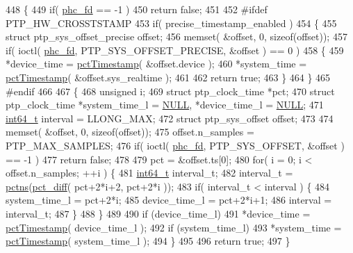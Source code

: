 \begin{DoxyCode}
448 \{
449     \textcolor{keywordflow}{if}( \hyperlink{class_linux_timestamper_generic_ac4500de48048f43e4cfd225a42c8bd56}{phc\_fd} == -1 )
450         \textcolor{keywordflow}{return} \textcolor{keyword}{false};
451 
452 \textcolor{preprocessor}{#ifdef PTP\_HW\_CROSSTSTAMP}
453     \textcolor{keywordflow}{if}( precise\_timestamp\_enabled )
454     \{
455         \textcolor{keyword}{struct }ptp\_sys\_offset\_precise offset;
456         memset( &offset, 0, \textcolor{keyword}{sizeof}(offset));
457         \textcolor{keywordflow}{if}( ioctl( \hyperlink{class_linux_timestamper_generic_ac4500de48048f43e4cfd225a42c8bd56}{phc\_fd}, PTP\_SYS\_OFFSET\_PRECISE, &offset ) == 0 )
458         \{
459             *device\_time = \hyperlink{linux__hal__generic_8cpp_a3943f78a47990dfd984f029f52c4eb9a}{pctTimestamp}( &offset.device );
460             *system\_time = \hyperlink{linux__hal__generic_8cpp_a3943f78a47990dfd984f029f52c4eb9a}{pctTimestamp}( &offset.sys\_realtime );
461 
462             \textcolor{keywordflow}{return} \textcolor{keyword}{true};
463         \}
464     \}
465 \textcolor{preprocessor}{#endif}
466 
467     \{
468         \textcolor{keywordtype}{unsigned} i;
469         \textcolor{keyword}{struct }ptp\_clock\_time *pct;
470         \textcolor{keyword}{struct }ptp\_clock\_time *system\_time\_l = \hyperlink{openavb__types__base__pub_8h_a070d2ce7b6bb7e5c05602aa8c308d0c4}{NULL}, *device\_time\_l = \hyperlink{openavb__types__base__pub_8h_a070d2ce7b6bb7e5c05602aa8c308d0c4}{NULL};
471         \hyperlink{parse_8c_a67a9885ef4908cb72ce26d75b694386c}{int64\_t} interval = LLONG\_MAX;
472         \textcolor{keyword}{struct }ptp\_sys\_offset offset;
473 
474         memset( &offset, 0, \textcolor{keyword}{sizeof}(offset));
475         offset.n\_samples = PTP\_MAX\_SAMPLES;
476         \textcolor{keywordflow}{if}( ioctl( \hyperlink{class_linux_timestamper_generic_ac4500de48048f43e4cfd225a42c8bd56}{phc\_fd}, PTP\_SYS\_OFFSET, &offset ) == -1 )
477             \textcolor{keywordflow}{return} \textcolor{keyword}{false};
478 
479         pct = &offset.ts[0];
480         \textcolor{keywordflow}{for}( i = 0; i < offset.n\_samples; ++i ) \{
481             \hyperlink{parse_8c_a67a9885ef4908cb72ce26d75b694386c}{int64\_t} interval\_t;
482             interval\_t = \hyperlink{linux__hal__generic_8cpp_a238d4b54a31c7b7887c421112e7feb24}{pctns}(\hyperlink{linux__hal__generic_8cpp_a2759ffc89a68098d5e5550dc48e4d1eb}{pct\_diff}( pct+2*i+2, pct+2*i ));
483             \textcolor{keywordflow}{if}( interval\_t < interval ) \{
484                 system\_time\_l = pct+2*i;
485                 device\_time\_l = pct+2*i+1;
486                 interval = interval\_t;
487             \}
488         \}
489 
490         \textcolor{keywordflow}{if} (device\_time\_l)
491             *device\_time = \hyperlink{linux__hal__generic_8cpp_a3943f78a47990dfd984f029f52c4eb9a}{pctTimestamp}( device\_time\_l );
492         \textcolor{keywordflow}{if} (system\_time\_l)
493             *system\_time = \hyperlink{linux__hal__generic_8cpp_a3943f78a47990dfd984f029f52c4eb9a}{pctTimestamp}( system\_time\_l );
494     \}
495 
496     \textcolor{keywordflow}{return} \textcolor{keyword}{true};
497 \}
\end{DoxyCode}


